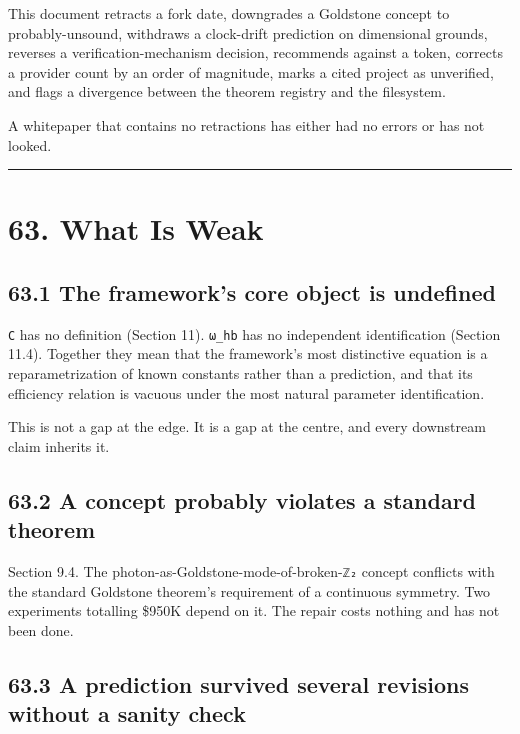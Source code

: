\documentclass[
  11pt]{report}
\begin{document}
This document retracts a fork date, downgrades a Goldstone concept to
probably-unsound, withdraws a clock-drift prediction on dimensional
grounds, reverses a verification-mechanism decision, recommends against
a token, corrects a provider count by an order of magnitude, marks a
cited project as unverified, and flags a divergence between the theorem
registry and the filesystem.

A whitepaper that contains no retractions has either had no errors or
has not looked.

\begin{center}\rule{0.5\linewidth}{0.5pt}\end{center}

\hypertarget{what-is-weak}{%
\chapter{63. What Is Weak}\label{what-is-weak}}

\hypertarget{the-frameworks-core-object-is-undefined}{%
\section{63.1 The framework's core object is
undefined}\label{the-frameworks-core-object-is-undefined}}

\texttt{C} has no definition (Section 11). \texttt{ω\_hb} has no
independent identification (Section 11.4). Together they mean that the
framework's most distinctive equation is a reparametrization of known
constants rather than a prediction, and that its efficiency relation is
vacuous under the most natural parameter identification.

This is not a gap at the edge. It is a gap at the centre, and every
downstream claim inherits it.

\hypertarget{a-concept-probably-violates-a-standard-theorem}{%
\section{63.2 A concept probably violates a standard
theorem}\label{a-concept-probably-violates-a-standard-theorem}}

Section 9.4. The photon-as-Goldstone-mode-of-broken-\texttt{ℤ₂} concept
conflicts with the standard Goldstone theorem's requirement of a
continuous symmetry. Two experiments totalling \$950K depend on it. The
repair costs nothing and has not been done.

\hypertarget{a-prediction-survived-several-revisions-without-a-sanity-check}{%
\section{63.3 A prediction survived several revisions without a sanity
check}\label{a-prediction-survived-several-revisions-without-a-sanity-check}}
\end{document}
